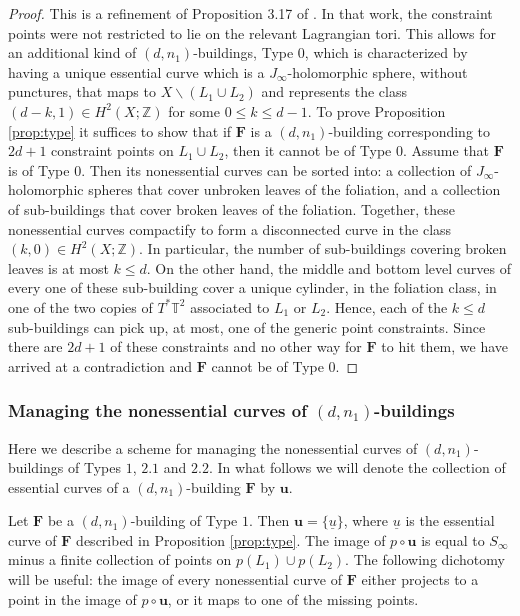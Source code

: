 \documentclass[12pt]{amsart}
\theoremstyle{definition}
\newcommand{\ZZ}{{\mathbb Z}}
\begin{document}
\begin{proof} This is a refinement of Proposition 3.17 of \cite{hiker}. In that work, the constraint points were not restricted to lie on the relevant Lagrangian tori. This allows for an additional kind of $(d,n_1)$-buildings, Type 0, which is characterized by having a unique essential curve which is a $J_\infty$-holomorphic sphere, without punctures, that maps to $X \smallsetminus (L_1 \cup L_2)$ and represents the class $(d-k,1) \in H^2(X;\ZZ)$ for some $0 \le k \le d-1$.  To prove Proposition \ref{prop:type} it  suffices to show that if $\mathbf{F}$ is a  $(d,n_1)$-building corresponding to $2d+1$ constraint points on $L_1 \cup L_2$, then it cannot be of Type 0. Assume that $\mathbf{F}$ is of Type 0. Then its nonessential curves can be sorted into: a collection of $J_\infty$-holomorphic spheres that cover unbroken leaves of the foliation,
and a collection of sub-buildings that cover broken leaves of the foliation. Together, these nonessential curves compactify to form a disconnected curve in the class $(k,0)\in H^2(X;\ZZ)$. In particular, the number of sub-buildings covering broken leaves is at most $k \le d$. On the other hand, the middle and bottom level curves of every one of these sub-building cover a unique cylinder, in the foliation class, in one of the two copies of $T^*\mathbb{T}^2$ associated to $L_1$ or $L_2$. Hence, each of the $k \le d$ sub-buildings can pick up, at most, one of the generic point constraints. Since there are $2d+1$ of these constraints  and no other way for $\mathbf{F}$ to hit them, we have arrived at a contradiction and $\mathbf{F}$ cannot be of Type 0.

\end{proof}




\subsubsection{Managing the nonessential curves of $(d,n_1)$-buildings}\label{common}

Here we describe a scheme for managing the nonessential curves of $(d,n_1)$-buildings of Types $1$, $2.1$ and $2.2$. In what follows we will denote the collection of essential curves of a $(d,n_1)$-building $\mathbf{F}$ by $\mathbf{u}$.


\bigskip

Let $\mathbf{F}$ be a $(d,n_1)$-building of Type $1$. Then $\mathbf{u} = \{\underline{u}\}$, where $\underline{u}$ is the essential curve of $\mathbf{F}$ described in Proposition \ref{prop:type}. The image of $p \circ \mathbf{u}$ is equal to $S_{\infty}$ minus a finite collection of points on $p(L_1) \cup p(L_2)$.
The following dichotomy will be useful: the image of every nonessential curve of $\mathbf{F}$ either projects to a point in the image of $p\circ \mathbf{u}$, or it maps to one of the missing points. 
\end{document}
